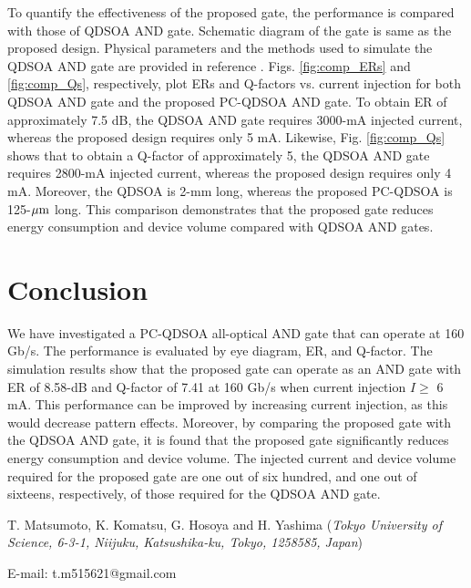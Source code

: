 \documentclass[twocolumn]{el-author}
\begin{document}
\newpage
To quantify the effectiveness of the proposed gate, the performance is compared with those of QDSOA AND gate. Schematic diagram of the gate is same as the proposed design. Physical parameters and the methods used to simulate the QDSOA AND gate are provided in reference {\cite{qdsoa_nssm}}. Figs. {\ref{fig:comp_ERs}} and {\ref{fig:comp_Qs}}, respectively, plot ERs and Q-factors vs. current injection for both QDSOA AND gate and the proposed PC-QDSOA AND gate. To obtain ER of approximately 7.5 dB, the QDSOA AND gate requires 3000-mA injected current, whereas the proposed design requires only 5 mA. Likewise, Fig. {\ref{fig:comp_Qs}} shows that to obtain a Q-factor of approximately 5, the QDSOA AND gate requires 2800-mA injected current, whereas the proposed design requires only 4 mA. Moreover, the QDSOA is 2-mm long, whereas the proposed PC-QDSOA is 125-${\rm{\mu m}}$ long. This comparison demonstrates that the proposed gate reduces energy consumption and device volume compared with QDSOA AND gates.

\section{Conclusion}
We have investigated a PC-QDSOA all-optical AND gate that can operate at 160 Gb/s. The performance is evaluated by eye diagram, ER, and Q-factor. The simulation results show that the proposed gate can operate as an AND gate with ER of 8.58-dB and Q-factor of 7.41 at 160 Gb/s when current injection $I \geq$ 6 mA. This performance can be improved by increasing current injection, as this would decrease pattern effects. Moreover, by comparing the proposed gate with the QDSOA AND gate, it is found that the proposed gate significantly reduces energy consumption and device volume. The injected current and device volume required for the proposed gate are one out of six hundred, and one out of sixteens, respectively, of those required for the QDSOA AND gate.
\vskip3pt

\vskip5pt

\noindent T. Matsumoto, K. Komatsu, G. Hosoya and H. Yashima (\textit{Tokyo University of Science, 6-3-1, Niijuku, Katsushika-ku, Tokyo, 1258585, Japan})
\vskip3pt

\noindent E-mail: t.m515621@gmail.com
\end{document}

